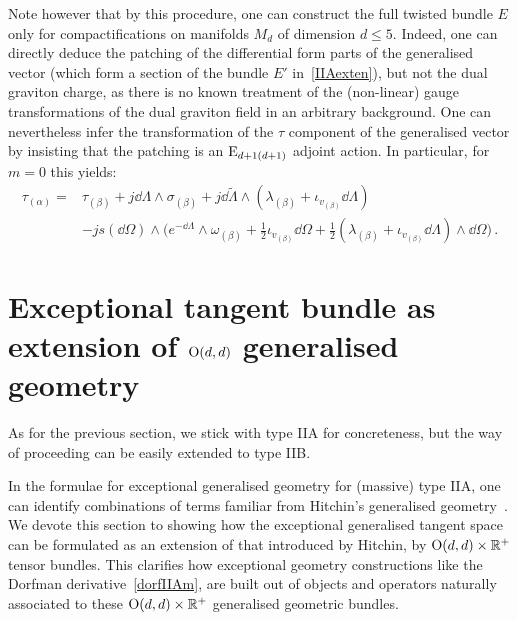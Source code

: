 \documentclass[debug]{phd}
\begin{document}
				Note however that by this procedure, one can construct the full twisted bundle $E$ only for compactifications on manifolds $M_d$ of dimension $d \leq 5$. 
 				Indeed, one can directly deduce the patching of the differential form parts of the generalised vector (which form a section of the bundle $E'$ in~\eqref{IIAexten}), but not the dual graviton charge, as there is no known treatment of the (non-linear) gauge transformations of the dual graviton field in an arbitrary background. 
				One can nevertheless infer the transformation of the $\tau$ component of the generalised vector by insisting that the patching is an $\mathrm{E}_{d+1 (d+1)}$ adjoint action. 
				In particular, for $m=0$ this yields:
						\begin{equation*}
							\begin{split}
							\tau_{(\alpha)} =& \tau_{(\beta)} + j \dd\Lambda\wedge \sigma_{(\beta)} + j\dd\tilde\Lambda\wedge (\lambda_{(\beta)} + \iota_{ v_{(\beta)}}\dd\Lambda) \\
										& -js(\dd\Omega)\wedge\big(e^{-\dd\Lambda}\wedge\omega_{(\beta)} + \tfrac{1}{2}\iota_{ v_{(\beta)}}\dd\Omega + \tfrac{1}{2} (\lambda_{(\beta)} + \iota_{ v_{(\beta)}}\dd\Lambda) \wedge \dd\Omega \big)\, .
							\end{split}
						\end{equation*}
	
		\section{\texorpdfstring{Exceptional tangent bundle as extension of $\mathrm{O}(d,d)$ generalised geometry}{Exceptional bundle as extension of \rmO(d,d) generalised geometry}}\label{appsec:EGGodd}
			As for the previous section, we stick with type IIA for concreteness, but the way of proceeding can be easily extended to type IIB.
			
			In the formulae for exceptional generalised geometry for (massive) type IIA, one can identify combinations of terms familiar from Hitchin's generalised geometry~\cite{hitch1,gualtphd}.
			We devote this section to showing how the exceptional generalised tangent space can be formulated as an extension of that introduced by Hitchin, by $\mathrm{O}(d,d)\times\mathbb{R}^+$ tensor bundles. 
			This clarifies how exceptional geometry constructions like the Dorfman derivative~\eqref{dorfIIAm}, are built out of objects and operators naturally associated to these $\mathrm{O}(d,d)\times\mathbb{R}^+$ generalised geometric bundles.
\end{document}
